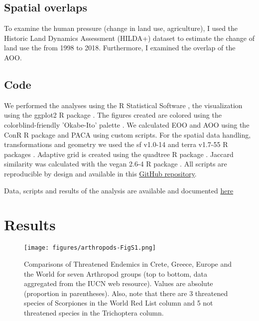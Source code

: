     \subsection{Spatial overlaps}
    \label{subsec:arthropods-spatial}
To examine the human pressure (change in land use, agriculture), I used the
Historic Land Dynamics Assessment (HILDA+) dataset \parencite{winkler2021global} to
estimate the change of land use the from 1998 to 2018. Furthermore, I examined
the overlap of the AOO.


    \subsection{Code}
    \label{subsec:arthropods-tools}

    We performed the analyses using the R Statistical Software \parencite{rcoreteam},
the visualization using the ggplot2 R package \parencite{wickham_ggplot2_2016}. The figures
created are colored using the colorblind-friendly 'Okabe-Ito' palette \parencite{ichihara2008color}.
We calculated EOO and AOO using the ConR R package \parencite{dauby2017conr:} and PACA
using custom scripts. For the spatial data handling, transformations and
geometry we used the sf v1.0-14 \parencite{pebesma2018simple} and terra v1.7-55 R packages \parencite{hijmans2024terra}.
Adaptive grid is created using the quadtree R package \parencite{friend2023quadtree}.
Jaccard similarity was calculated with the vegan 2.6-4 R package \parencite{oksanen2024vegan}.
All scripts are reproducible by design and available in this 
\href{https://github.com/savvas-paragkamian/arthropoda_assessment_crete}{GitHub repository}.

Data, scripts and results of the analysis are available and documented \href{https://github.com/savvas-paragkamian/arthropods_assessment_crete}{here} 

\section{Results}
\label{sec:arthropods-results}

   \begin{figure}[htp!]
      \centering
      \texttt{[image: figures/arthropods-FigS1.png]}
      \caption[Comparisons of Threatened Endemics in Crete, Greece, Europe and the World]{Comparisons of Threatened Endemics in Crete, Greece, Europe and the World for seven Arthropod groups (top to bottom, data aggregated from the IUCN web resource). Values are absolute (proportion in parentheses). Also, note that there are 3 threatened species of Scorpiones in the World Red List column and 5 not threatened species in the Trichoptera column.}
      \label{fig:arthropods-figS1}
   \end{figure}

